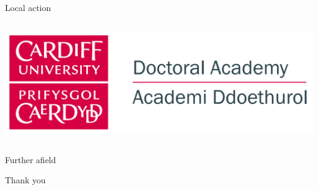 \documentclass{beamer}
\begin{document}
\begin{frame}{Local action}
\begin{columns}[T]
\begin{column}{.5\textwidth}
            \vspace{30pt}
            \includegraphics[width=.8\linewidth]{academy.png}
        \end{column}
    \end{columns}
\end{frame}


\begin{frame}{Further afield}

\end{frame}


\begin{frame}{Thank you}

\end{frame}
\end{document}
